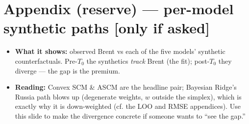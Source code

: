 \documentclass[11pt,a4paper]{article}
\newcommand{\timetag}[1]{\hfill\textcolor{muted}{\small[#1]}}
\newcommand{\highlight}[1]{\textcolor{accent}{\textbf{#1}}}
\begin{document}
\section{Appendix (reserve) --- per-model synthetic paths \timetag{only if asked}}
\begin{itemize}
  \item \highlight{What it shows:} observed Brent vs each of the five models' synthetic counterfactuals.
    Pre-$T_0$ the synthetics \emph{track} Brent (the fit); post-$T_0$ they diverge --- the gap is the premium.
  \item \highlight{Reading:} Convex SCM \& ASCM are the headline pair; Bayesian Ridge's Russia path blows up
    (degenerate weights, $w$ outside the simplex), which is exactly why it is down-weighted (cf. the LOO and
    RMSE appendices). Use this slide to make the divergence concrete if someone wants to ``see the gap.''
\end{itemize}
\end{document}
